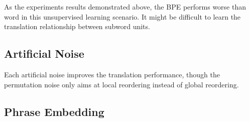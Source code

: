 As the experiments results demonstrated above, the BPE performs worse than word in this unsupervised learning scenario. It might be difficult to learn the translation relationship between subword units. 

\subsection{Artificial Noise}

	\begin{table}[H]
	\centering
	\setcounter{table}{1}
	\label{tab:denoising}
\end{table}
Each artificial noise improves the translation performance, though the permutation noise only aims at local reordering instead of global reordering.




\subsection{Phrase Embedding}

